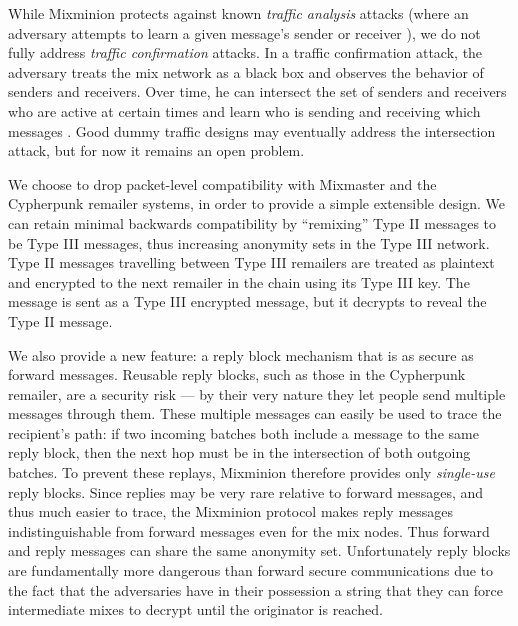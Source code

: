 \documentclass[11pt]{IEEEtran}
\begin{document}
While Mixminion protects against known \emph{traffic analysis} attacks
(where an adversary attempts to learn a given message's sender or
receiver \cite{rackoff93cryptographic}\cite{raymond00}), we do not fully
address \emph{traffic confirmation} attacks. In a traffic confirmation
attack, the adversary treats the mix network as a black box and
observes the behavior of senders and receivers. Over time, he can
intersect the set of senders and receivers who are active at certain
times and learn who is sending and receiving which messages
\cite{langos02}. Good dummy traffic designs may eventually address the
intersection attack, but for now it remains an open problem.

We choose to drop packet-level compatibility with Mixmaster and the
Cypherpunk remailer systems, in order to provide a simple extensible
design. We can retain minimal backwards compatibility by ``remixing''
Type II messages to be Type III messages, thus increasing anonymity
sets in the Type III network. Type II messages travelling between
Type III remailers are treated
as plaintext and encrypted to the next remailer in the chain using its
Type III key. The message is sent as a Type III encrypted message, but
it decrypts to reveal the Type II message.

We also provide a new feature: a reply block mechanism that is as secure
as forward messages.
Reusable reply blocks, such as those in the Cypherpunk remailer, are a
security risk --- by their very nature they let people send multiple
messages through them.  These multiple messages can easily be used to
trace the recipient's path: if two incoming batches both include a
message to the same reply block, then the next hop must be in the
intersection of both outgoing batches.  To prevent these replays,
Mixminion therefore provides only \emph{single-use} reply blocks. Since
replies may be very rare relative to forward messages, and thus
much easier to trace, the Mixminion protocol makes reply messages
indistinguishable from forward messages even for the mix nodes. Thus
forward and reply messages can share the same anonymity
set. Unfortunately reply blocks are fundamentally more dangerous than
forward secure communications due to the fact that the adversaries have
in their possession a string that they can force intermediate mixes to
decrypt until the originator is reached.
\end{document}
